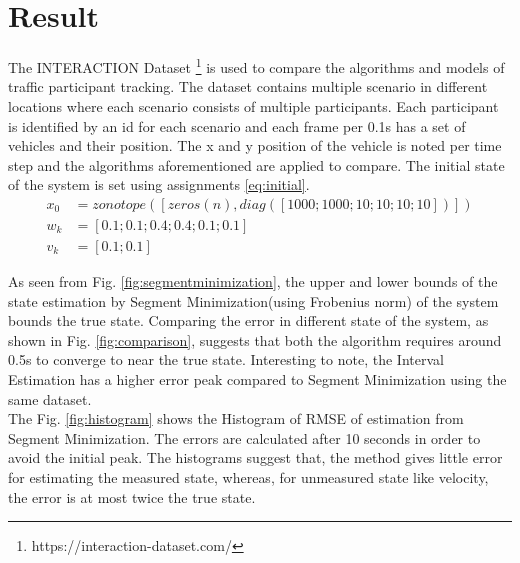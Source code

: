 \chapter{Result} \label{ch:result}
The INTERACTION Dataset \footnote{https://interaction-dataset.com/} is used to compare the algorithms and models of traffic participant tracking. The dataset contains multiple scenario in different locations where each scenario consists of multiple participants. Each participant is identified by an id for each scenario and each frame per 0.1s has a set of vehicles and their position. The x and y position of the vehicle is noted per time step and the algorithms aforementioned are applied to compare. The initial state of the system is set using assignments \ref{eq:initial}.
\begin{equation}
\label{eq:initial}
\begin{split}
x_0 &= zonotope([zeros(n), diag([1000;1000;10;10;10;10])])\\
w_k &= [0.1;0.1;0.4;0.4;0.1;0.1]\\
v_k &= [0.1;0.1]
\end{split}
\end{equation}

As seen from Fig. \ref{fig:segmentminimization}, the upper and lower bounds of the state estimation by Segment Minimization(using Frobenius norm) of the system bounds the true state. Comparing the error in different state of the system, as shown in Fig. \ref{fig:comparison}, suggests that both the algorithm requires around 0.5s to converge to near the true state. Interesting to note, the Interval Estimation has a higher error peak compared to Segment Minimization using the same dataset.\\

The Fig. \ref{fig:histogram} shows the Histogram of RMSE of estimation from Segment Minimization. The errors are calculated after 10 seconds in order to avoid the initial peak. The histograms suggest that, the method gives little error for estimating the measured state, whereas, for unmeasured state like velocity, the error is at most twice the true state.

